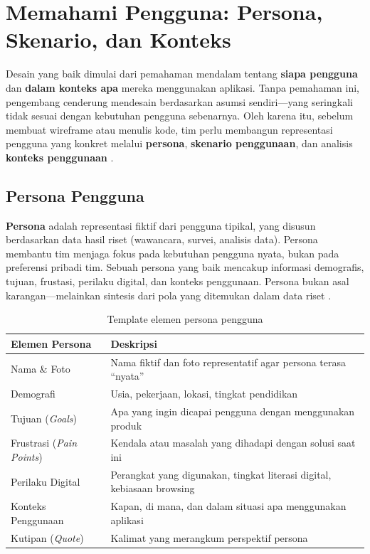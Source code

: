 ﻿\section{Memahami Pengguna: Persona, Skenario, dan Konteks}

Desain yang baik dimulai dari pemahaman mendalam tentang \textbf{siapa pengguna} dan \textbf{dalam konteks apa} mereka menggunakan aplikasi. Tanpa pemahaman ini, pengembang cenderung mendesain berdasarkan asumsi sendiri---yang seringkali tidak sesuai dengan kebutuhan pengguna sebenarnya. Oleh karena itu, sebelum membuat wireframe atau menulis kode, tim perlu membangun representasi pengguna yang konkret melalui \textbf{persona}, \textbf{skenario penggunaan}, dan analisis \textbf{konteks penggunaan} \cite{nngroup}.

\subsection{Persona Pengguna}

\textbf{Persona} adalah representasi fiktif dari pengguna tipikal, yang disusun berdasarkan data hasil riset (wawancara, survei, analisis data). Persona membantu tim menjaga fokus pada kebutuhan pengguna nyata, bukan pada preferensi pribadi tim. Sebuah persona yang baik mencakup informasi demografis, tujuan, frustasi, perilaku digital, dan konteks penggunaan. Persona bukan asal karangan---melainkan sintesis dari pola yang ditemukan dalam data riset \cite{ixdf}.

\begin{table}[H]
\centering
\begin{tabular}{|P{3.5cm}|P{8.5cm}|}
\hline
\textbf{Elemen Persona} & \textbf{Deskripsi} \\
\hline
Nama \& Foto & Nama fiktif dan foto representatif agar persona terasa ``nyata'' \\
\hline
Demografi & Usia, pekerjaan, lokasi, tingkat pendidikan \\
\hline
Tujuan (\textit{Goals}) & Apa yang ingin dicapai pengguna dengan menggunakan produk \\
\hline
Frustrasi (\textit{Pain Points}) & Kendala atau masalah yang dihadapi dengan solusi saat ini \\
\hline
Perilaku Digital & Perangkat yang digunakan, tingkat literasi digital, kebiasaan browsing \\
\hline
Konteks Penggunaan & Kapan, di mana, dan dalam situasi apa menggunakan aplikasi \\
\hline
Kutipan (\textit{Quote}) & Kalimat yang merangkum perspektif persona \\
\hline
\end{tabular}
\caption{Template elemen persona pengguna}
\end{table}

